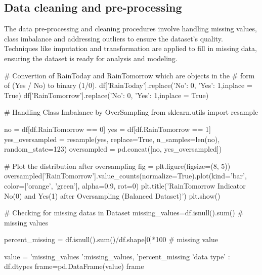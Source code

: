 \documentclass{josis}
\begin{document}
\subsection{Data cleaning and pre-processing}
The data pre-processing and cleaning procedures involve handling missing values, class imbalance and addressing outliers to ensure the dataset's quality. Techniques like imputation and transformation are applied to fill in missing data, ensuring the dataset is ready for analysis and modeling.
\begin{python}
# Convertion of RainToday and RainTomorrow which are objects in the
# form of (Yes / No) to binary (1/0).
df['RainToday'].replace({'No': 0, 'Yes': 1},inplace = True)
df['RainTomorrow'].replace({'No': 0, 'Yes': 1},inplace = True)
\end{python}

\begin{python}
# Handling Class Imbalance by OverSampling
from sklearn.utils import resample

no = df[df.RainTomorrow == 0]
yes = df[df.RainTomorrow == 1]
yes_oversampled = resample(yes, replace=True, n_samples=len(no), random_state=123)
oversampled = pd.concat([no, yes_oversampled])

# Plot the distribution after oversampling
fig = plt.figure(figsize=(8, 5))
oversampled['RainTomorrow'].value_counts(normalize=True).plot(kind='bar', color=['orange', 'green'], alpha=0.9, rot=0)
plt.title('RainTomorrow Indicator No(0) and Yes(1) after Oversampling (Balanced Dataset)')
plt.show()
\end{python}

\begin{python}
# Checking for missing datas in Dataset
missing_values=df.isnull().sum() # missing values

percent_missing = df.isnull().sum()/df.shape[0]*100 # missing value %

value = {
    'missing_values ':missing_values,
    'percent_missing %
     'data type' : df.dtypes
}
frame=pd.DataFrame(value)
frame
\end{python}
\end{document}

